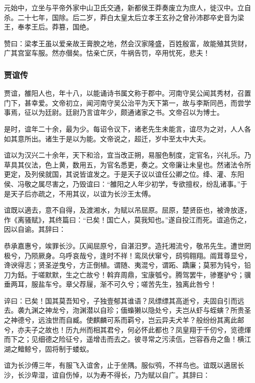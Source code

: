 \documentclass[]{article}
\begin{document}
元始中，立坐与平帝外家中山卫氏交通，新都侯王莽奏废立为庶人，徙汉中。立自杀。二十七年，国除。后二岁，莽白太皇太后立孝王玄孙之曾孙沛郡卒史音为梁王，奉孝王后。莽篡，国绝。

赞曰：梁孝王虽以爱亲故王膏腴之地，然会汉家隆盛，百姓殷富，故能殖其货财，广其宫室车服。然亦僣矣。怙亲亡厌，牛祸告罚，卒用忧死，悲夫！

\hypertarget{header-n4094}{%
\subsubsection{贾谊传}\label{header-n4094}}

贾谊，雒阳人也，年十八，以能诵诗书属文称于郡中。河南守吴公闻其秀材，召置门下，甚幸爱。文帝初立，闻河南守吴公治平为天下第一，故与李斯同邑，而尝学事焉，征以为廷尉。廷尉乃言谊年少，颇通诸家之书。文帝召以为博士。

是时，谊年二十余，最为少。每诏令议下，诸老先生未能言，谊尽为之对，人人各如其意所出。诸生于是以为能。文帝说之，超迁，岁中至太中大夫。

谊以为汉兴二十余年，天下和洽，宜当改正朔，易服色制度，定官名，兴礼乐。乃草具其仪法，色上黄，数用五，为官名悉更，奏之。文帝廉让未皇也。然诸法令所更定，及列侯就国，其说皆谊发之。于是天子议以谊任公卿之位。绛、灌、东阳侯、冯敬之属尽害之，乃毁谊曰：``雒阳之人年少初学，专欲擅权，纷乱诸事。''于是天子后亦疏之，不用其议，以谊为长沙王太傅。

谊既以適去，意不自得，及渡湘水，为赋以吊屈原。屈原，楚贤臣也，被谗放逐，作《离骚赋》，其终篇曰：``已矣！国亡人，莫我知也。''遂自投江而死。谊追伤之，因以自谕。其辞曰：

恭承嘉惠兮，竢罪长沙。仄闻屈原兮，自湛汨罗。造托湘流兮，敬吊先生。遭世罔极兮，乃陨厥身。乌呼哀哉兮，逢时不祥！鸾凤伏窜兮，鸱鸮翱翔。阘茸尊显兮，谗谀得志；贤圣逆曳兮，方正倒植。谓随、夷混兮，谓跖、蹻廉；莫邪为钝兮，铅刀为銛。于嗟默默，生之亡故兮！斡弃周鼎，宝康瓠兮。腾驾罢牛，骖蹇驴兮；骥垂两耳，服盐车兮。章父荐屦，渐不可久兮；嗟苦先生，独离此咎兮！

谇曰：已矣！国其莫吾知兮，子独壹郁其谁语？凤缥缥其高逝兮，夫固自引而远去。袭九渊之神龙兮，沕渊潜以自珍；偭蟂獭以隐处兮，夫岂从虾与蛭螾？所贵圣之神德兮，远浊世而自臧。使麒麟可系而羁兮，岂云异夫犬羊？般纷纷其离此邮兮，亦夫子之故也！历九州而相其君兮，何必怀此都也？凤皇翔于千仞兮，览德煇而下之；见细德之险征兮，遥增击而去之。彼寻常之污渎佤，岂容吞舟之鱼！横江湖之鳣鲸兮，固将制于蝼蚁。

谊为长沙傅三年，有服飞入谊舍，止于坐隅。服似鸮，不祥鸟也。谊既以適居长沙，长沙卑湿，谊自伤悼，以为寿不得长，乃为赋以自广。其辞曰：
\end{document}
